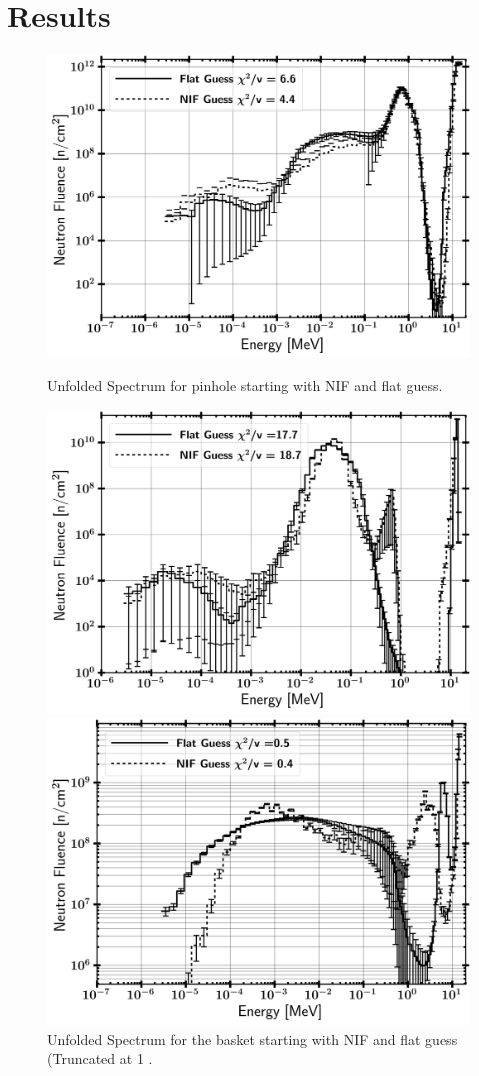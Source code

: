 \documentclass[journal]{IEEEtran}
\let\MYoriglatexcaption\caption
\renewcommand{\caption}[2][\relax]{\MYoriglatexcaption[#2]{#2}}
\begin{document}
	\section{Results}
	\begin{figure}[t!]
		\includegraphics[width=\linewidth]{Figures/PinBothLog.png}
		\caption{Unfolded Spectrum for pinhole starting with NIF and flat guess.}
		\label{fig:pin}
		\vskip 0.9cm
		\includegraphics[width=\linewidth]{Figures/BaskBothLogZoomed.png}
		\caption{Unfolded Spectrum for the basket starting with NIF and flat guess (Truncated at 1 \text{$n-cm^{-2}$)}.}
		\label{fig:bask}
		\vskip 0.9cm
		\includegraphics[width=\linewidth]{Figures/KBASBothLog.png}

\end{figure}
\end{document}
